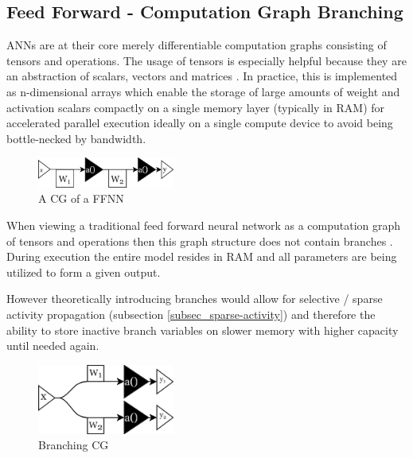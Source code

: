  
 
\clearpage



\subsection{Feed Forward - Computation Graph Branching}\label{subsec_feed-forward}


\acp{ANN} are at their core merely differentiable computation graphs consisting of tensors and operations. The usage of tensors is especially helpful because they are an abstraction of 
scalars, vectors and matrices \cite{22_era-of-big-data-processing} \cite[section 2.1]{Goodfellow-et-al-2016}. In practice, this is implemented as n-dimensional arrays which enable the storage of large amounts of weight and activation scalars compactly on a single memory layer (typically in \acs{RAM}) for accelerated parallel execution ideally on a single compute device to avoid being bottle-necked by bandwidth.\linebreak

\begin{figure}
  \centering 
  \includegraphics[width=0.40\textwidth]{PICs/simple-feed-forward.png} 
  \caption{A CG of a FFNN}
\end{figure}

When viewing a traditional feed forward neural network as a computation graph of tensors and operations then this graph structure does not contain branches \cite[chapter 6]{Goodfellow-et-al-2016}.
During execution the entire model resides in RAM and all parameters are being utilized to form a given output. \linebreak
  

However theoretically introducing branches would allow for selective / sparse activity propagation (subsection \ref{subsec_sparse-activity}) and therefore the ability to store inactive branch variables on slower memory with higher capacity until needed again.


\begin{figure}
  \centering 
  \includegraphics[width=0.40\textwidth]{PICs/branching-illustration.png}
  \caption{Branching CG}
\end{figure}
 

